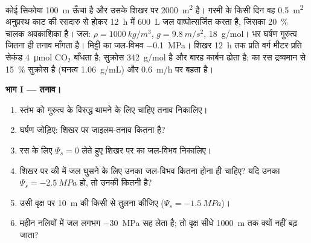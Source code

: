 \begin{problem}
\label{pb:b1:plant-transport:1}
कोई सिकोया \qty{100}{m} ऊँचा है और उसके शिखर पर \qty{2000}{m^2} 
है। गरमी के किसी दिन वह \qty{0.5}{m^2} अनुप्रस्थ काट की रसदारु से होकर
\qty{12}{h} में \qty{600}{L} जल वाष्पोत्सर्जित करता है, जिसका
\qty{20}{\%} चालक अवकाशिका है। जल: $\rho = \qty{1000}{kg/m^3}$, $g =
\qty{9.8}{m/s^2}$, \qty{18}{g/mol}।  भर घर्षण गुरुत्व जितना ही तनाव
माँगता है। मिट्टी का जल-विभव \qty{-0.1}{MPa}। शिखर \qty{12}{h} तक प्रति
वर्ग मीटर  प्रति सेकंड \qty{4}{\micro mol} $\mathrm{CO_2}$ बाँधता
है; सुक्रोस \qty{342}{g/mol} है और बारह कार्बन ढोता है;  का रस
द्रव्यमान से \qty{15}{\%} सुक्रोस है (घनत्व \qty{1.06}{g/mL}) और
\qty{0.6}{m/h} पर बहता है।

\medskip
\noindent\textbf{भाग I --- तनाव।}
\begin{enumerate}
  \item स्तंभ को गुरुत्व के विरुद्ध थामने के लिए चाहिए तनाव
        निकालिए।
  \item घर्षण जोड़िए: शिखर पर जाइलम-तनाव कितना है?
  \item रस के लिए $\Psi_s = 0$ लेते हुए शिखर पर  का जल-विभव
        निकालिए।
  \item शिखर पर  की  में जल घुसने के लिए उनका जल-विभव
        कितना होना ही चाहिए? यदि उनका $\Psi_s = \qty{-2.5}{MPa}$ हो, तो
        उनकी  कितनी है?
  \item उसी वृक्ष पर \qty{10}{m} की किसी  से तुलना कीजिए ($\Psi_s =
        \qty{-1.5}{MPa}$)।
  \item महीन नलियों में जल लगभग \qty{-30}{MPa} सह लेता है; तो वृक्ष
        सीधे \qty{1000}{m} तक क्यों नहीं बढ़ जाता?
\end{enumerate}


\end{problem}
